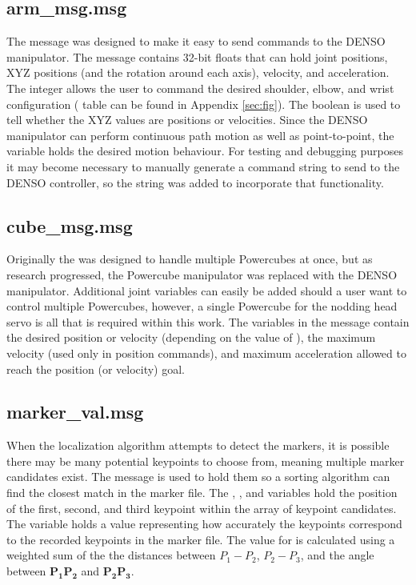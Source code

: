 \subsection{arm\_msg.msg}
The  message was designed to make it easy to send commands to the DENSO manipulator. The message contains 32-bit floats that can hold joint positions, XYZ positions (and the rotation around each axis), velocity, and acceleration. The  integer allows the user to command the desired shoulder, elbow, and wrist configuration ( table can be found in Appendix \ref{sec:fig}). The  boolean is used to tell  whether the XYZ values are positions or velocities. Since the DENSO manipulator can perform continuous path motion as well as point-to-point, the  variable holds the desired motion behaviour. For testing and debugging purposes it may become necessary to manually generate a command string to send to the DENSO controller, so the string  was added to incorporate that functionality.\\

\subsection{cube\_msg.msg}
Originally the  was designed to handle multiple Powercubes at once, but as research progressed, the Powercube manipulator was replaced with the DENSO manipulator. Additional joint variables can easily be added should a user want to control multiple Powercubes, however, a single Powercube for the nodding head servo is all that is required within this work. The variables in the  message contain the desired position or velocity (depending on the value of ), the maximum velocity (used only in position commands), and maximum acceleration allowed to reach the position (or velocity) goal.\\
\clearpage
\subsection{marker\_val.msg}
When the localization algorithm attempts to detect the markers, it is possible there may be many potential keypoints to choose from, meaning multiple marker candidates exist. The  message is used to hold them so a sorting algorithm can find the closest match in the marker file. The , , and  variables hold the position of the first, second, and third keypoint within the array of keypoint candidates. The  variable holds a value representing how accurately the keypoints correspond to the recorded keypoints in the marker file. The value for  is calculated using a weighted sum of the the distances between $P_1-P_2$, $P_2-P_3$, and the angle between $\mathbf{P_1P_2}$ and $\mathbf{P_2P_3}$. \\

